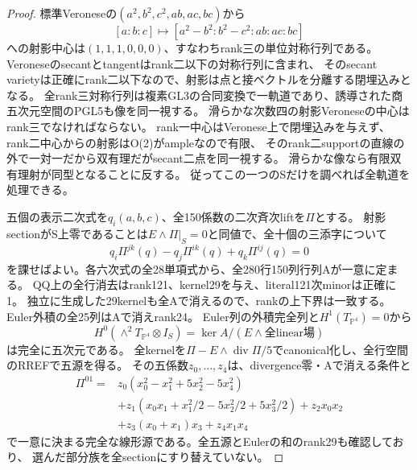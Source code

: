 \documentclass[a4paper,11pt]{ltjsarticle}
\theoremstyle{definition}
\begin{document}
\begin{proof}
標準Veroneseの$(a^2,b^2,c^2,ab,ac,bc)$から
\[
 [a:b:c]\longmapsto[a^2-b^2:b^2-c^2:ab:ac:bc]
\]
への射影中心は$(1,1,1,0,0,0)$、すなわちrank三の単位対称行列である。
Veroneseのsecantとtangentはrank二以下の対称行列に含まれ、
そのsecant varietyは正確にrank二以下なので、射影は点と接ベクトルを分離する閉埋込みとなる。
全rank三対称行列は複素GL3の合同変換で一軌道であり、誘導された商五次元空間のPGL5も像を同一視する。
滑らかな次数四の射影Veroneseの中心はrank三でなければならない。
rank一中心はVeronese上で閉埋込みを与えず、rank二中心からの射影はO(2)がampleなので有限、
そのrank二supportの直線の外で一対一だから双有理だがsecant二点を同一視する。
滑らかな像なら有限双有理射が同型となることに反する。
従ってこの一つのSだけを調べれば全軌道を処理できる。

五個の表示二次式を$q_i(a,b,c)$、全150係数の二次斉次liftを$\Pi$とする。
射影sectionがS上零であることは$E\wedge\Pi|_S=0$と同値で、全十個の三添字について
\[
 q_i\Pi^{jk}(q)-q_j\Pi^{ik}(q)+q_k\Pi^{ij}(q)=0
\]
を課せばよい。各六次式の全28単項式から、全280行150列行列Aが一意に定まる。
QQ上の全行消去はrank121、kernel29を与え、literal121次minorは正確に1。
独立に生成した29kernelも全Aで消えるので、rankの上下界は一致する。
Euler外積の全25列はAで消えrank24。
Euler列の外積完全列と$H^1(T_{\mathbb P^4})=0$から
\[
 H^0(\wedge^2T_{\mathbb P^4}\otimes I_S)=\ker A/(E\wedge\text{全linear場})
\]
は完全に五次元である。
全kernelを$\Pi-E\wedge\operatorname{div}\Pi/5$でcanonical化し、全行空間のRREFで五源を得る。
その五係数$z_0,\ldots,z_4$は、divergence零・Aで消える条件と
\[
\begin{aligned}
 \Pi^{01}={}&z_0(x_0^2-x_1^2+5x_2^2-5x_4^2)\\
 &+z_1(x_0x_1+x_1^2/2-5x_2^2/2+5x_3^2/2)+z_2x_0x_2\\
 &+z_3(x_0+x_1)x_3+z_4x_1x_4
\end{aligned}
\]
で一意に決まる完全な線形源である。全五源とEulerの和のrank29も確認しており、
選んだ部分族を全sectionにすり替えていない。


\end{proof}
\end{document}
